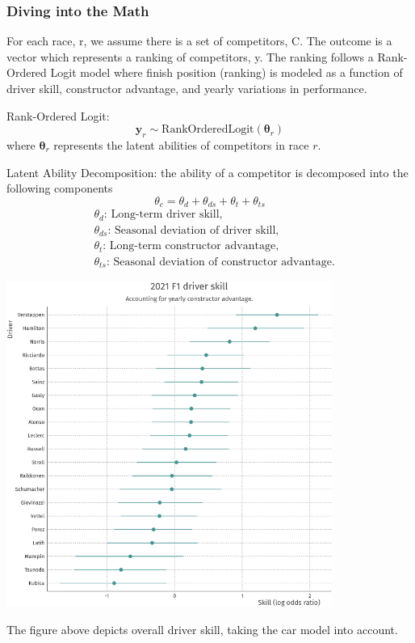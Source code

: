 \documentclass[12pt]{article}
\begin{document}
\subsubsection{Diving into the Math}
For each race, r, we assume there is a set of competitors, C. The outcome is a vector which 
represents a ranking of competitors, y. The ranking follows a Rank-Ordered Logit model where 
finish position (ranking) is modeled as a function of driver skill, constructor advantage, and 
yearly variations in performance.

Rank-Ordered Logit:
\[
\mathbf{y}_r \sim \text{RankOrderedLogit}(\boldsymbol{\theta}_r)
\]
where \(\boldsymbol{\theta}_r\) represents the latent abilities of competitors in race \(r\).

Latent Ability Decomposition: 
the ability of a competitor is decomposed into the following components
\[
\theta_c = \theta_d + \theta_{ds} + \theta_t + \theta_{ts}
\]
\[
\begin{aligned}
&\theta_d \text{: Long-term driver skill,} \\
&\theta_{ds} \text{: Seasonal deviation of driver skill,} \\
&\theta_t \text{: Long-term constructor advantage,} \\
&\theta_{ts} \text{: Seasonal deviation of constructor advantage.}
\end{aligned}
\]



\begin{center}
    \includegraphics[width=0.8\textwidth]{driver skill.jpg}
    \end{center}
The figure above depicts overall driver skill, taking the car model into account.
\end{document}
